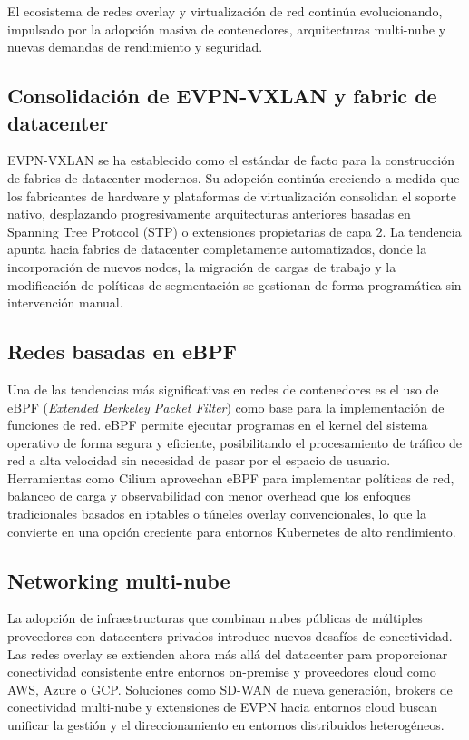El ecosistema de redes overlay y virtualización de red continúa evolucionando, impulsado por la adopción masiva de contenedores, arquitecturas multi-nube y nuevas demandas de rendimiento y seguridad.

\subsection{Consolidación de EVPN-VXLAN y fabric de datacenter}

EVPN-VXLAN se ha establecido como el estándar de facto para la construcción de fabrics de datacenter modernos. Su adopción continúa creciendo a medida que los fabricantes de hardware y plataformas de virtualización consolidan el soporte nativo, desplazando progresivamente arquitecturas anteriores basadas en Spanning Tree Protocol (STP) o extensiones propietarias de capa 2. La tendencia apunta hacia fabrics de datacenter completamente automatizados, donde la incorporación de nuevos nodos, la migración de cargas de trabajo y la modificación de políticas de segmentación se gestionan de forma programática sin intervención manual.

\subsection{Redes basadas en eBPF}

Una de las tendencias más significativas en redes de contenedores es el uso de eBPF (\textit{Extended Berkeley Packet Filter}) como base para la implementación de funciones de red. eBPF permite ejecutar programas en el kernel del sistema operativo de forma segura y eficiente, posibilitando el procesamiento de tráfico de red a alta velocidad sin necesidad de pasar por el espacio de usuario. Herramientas como Cilium aprovechan eBPF para implementar políticas de red, balanceo de carga y observabilidad con menor overhead que los enfoques tradicionales basados en iptables o túneles overlay convencionales, lo que la convierte en una opción creciente para entornos Kubernetes de alto rendimiento.

\subsection{Networking multi-nube}

La adopción de infraestructuras que combinan nubes públicas de múltiples proveedores con datacenters privados introduce nuevos desafíos de conectividad. Las redes overlay se extienden ahora más allá del datacenter para proporcionar conectividad consistente entre entornos on-premise y proveedores cloud como AWS, Azure o GCP. Soluciones como SD-WAN de nueva generación, brokers de conectividad multi-nube y extensiones de EVPN hacia entornos cloud buscan unificar la gestión y el direccionamiento en entornos distribuidos heterogéneos.

